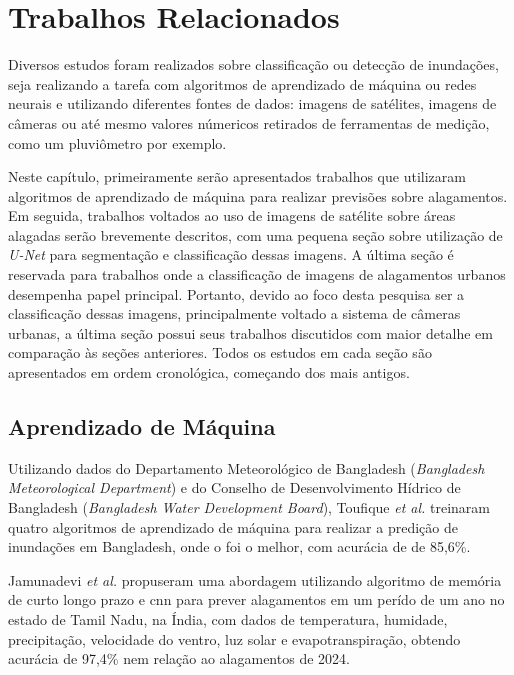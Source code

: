 \chapter{Trabalhos Relacionados}\label{cap:trabalhos}
Diversos estudos foram realizados sobre classificação ou detecção de inundações, seja realizando a tarefa com algoritmos de aprendizado de máquina ou redes neurais
e utilizando diferentes fontes de dados: imagens de satélites, imagens de câmeras ou até mesmo valores númericos retirados de ferramentas de medição, como um pluviômetro por exemplo.

Neste capítulo, primeiramente serão apresentados trabalhos que utilizaram algoritmos de aprendizado de máquina para realizar previsões sobre alagamentos.
Em seguida, trabalhos voltados ao uso de imagens de satélite sobre áreas alagadas serão brevemente descritos, com uma pequena seção sobre utilização de \textit{U-Net} para segmentação e 
classificação dessas imagens.
A última seção é reservada para trabalhos onde a classificação de imagens de alagamentos urbanos desempenha papel principal.
Portanto, devido ao foco desta pesquisa ser a classificação dessas imagens, principalmente voltado a sistema de câmeras urbanas, 
a última seção possui seus trabalhos discutidos com maior detalhe em comparação às seções anteriores.
Todos os estudos em cada seção são apresentados em ordem cronológica, começando dos mais antigos.
\section{Aprendizado de Máquina}

Utilizando dados do Departamento Meteorológico de Bangladesh (\textit{Bangladesh Meteorological Department}) e do Conselho de Desenvolvimento Hídrico de Bangladesh (\textit{Bangladesh Water Development
Board}), Toufique \textit{et al.} \cite{toufique2024} treinaram quatro algoritmos de aprendizado de máquina para realizar a predição de inundações em Bangladesh, 
onde o  \cite{randomforest}foi o melhor, com acurácia de de 85,6\%.

Jamunadevi \textit{et al.} \cite{jamunadevi2024} propuseram uma abordagem utilizando algoritmo de memória de curto longo prazo \cite{lstm} e \acrshort{cnn} 
para prever alagamentos em um perído de um ano no estado de Tamil Nadu, na Índia, com dados de temperatura, humidade, precipitação, velocidade do ventro, luz solar e evapotranspiração,
obtendo acurácia de 97,4\% nem relação ao alagamentos de 2024.

